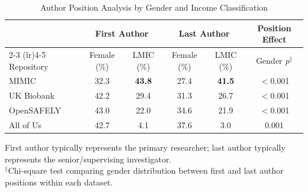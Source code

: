\begin{table}[htbp]
\centering
\caption{Author Position Analysis by Gender and Income Classification}
\label{tab:positions}
\begin{tabular}{lccccc}
\toprule
 & \multicolumn{2}{c}{First Author} & \multicolumn{2}{c}{Last Author} & Position Effect \\
\cmidrule(lr){2-3} \cmidrule(lr){4-5}
Repository & Female (\%) & LMIC (\%) & Female (\%) & LMIC (\%) & Gender \textit{p}$^\|$ \\
\midrule
MIMIC      & 32.3 & \textbf{43.8} & 27.4 & \textbf{41.5} & $<$0.001 \\
UK Biobank & 42.2 & 29.4 & 31.3 & 26.7 & $<$0.001 \\
OpenSAFELY & 43.0 & 22.0 & 34.6 & 21.9 & $<$0.001 \\
All of Us  & 42.7 & 4.1  & 37.6 & 3.0 & 0.001 \\
\bottomrule
\end{tabular}

\smallskip
\footnotesize
First author typically represents the primary researcher; last author typically represents the senior/supervising investigator. \\
$^\|$Chi-square test comparing gender distribution between first and last author positions within each dataset.
\end{table}



